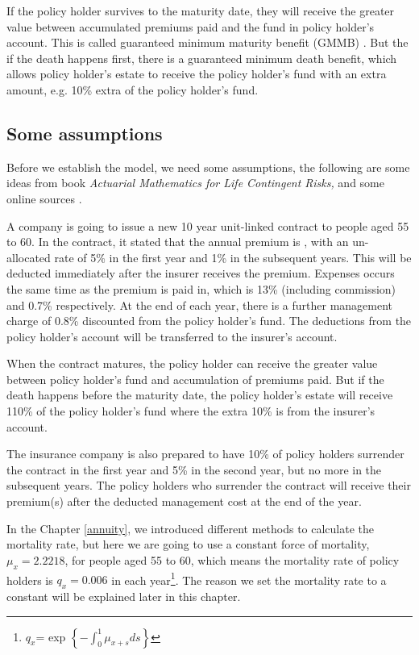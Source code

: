 \documentclass{report}
\begin{document}
If the policy holder survives to the maturity date, they will receive the greater value between accumulated premiums paid and the fund in policy holder's account. This is called guaranteed minimum maturity benefit (GMMB) \cite{bib:GMMB}. But the if the death happens first, there is a guaranteed minimum death benefit, which allows policy holder's estate to receive the policy holder's fund with an extra amount, e.g. 10\% extra of the policy holder's fund. 


\subsection{Some assumptions}  \label{unit-link-basic-assumptions}

Before we establish the model, we need some assumptions, the following are some ideas from  \cite{bib:unitlinkeg} book {\em Actuarial Mathematics for Life Contingent Risks,} and some online sources \cite{bib:unitlinkedonline}. 


A company is going to issue a new 10 year unit-linked contract to people aged 55 to 60. In the contract, it stated that the annual premium is , with an un-allocated rate of 5\% in the first year and 1\% in the subsequent years. This will be deducted immediately after the insurer receives the premium. Expenses occurs the same time as the premium is paid in, which is 13\% (including commission) and 0.7\% respectively. At the end of each year, there is a further management charge of 0.8\%  discounted from the policy holder's fund. The deductions from the policy holder's account will be transferred to the insurer's account.

When the contract matures, the policy holder can receive the greater value between policy holder's fund and accumulation of premiums paid. But if the death happens before the maturity date, the policy holder's estate will receive 110\% of the policy holder's fund where the extra 10\% is from the insurer's account.

The insurance company is also prepared to have 10\% of policy holders surrender the contract in the first year and 5\% in the second year, but no more in the subsequent years. The policy holders who surrender the contract will receive their premium(s) after the deducted management cost at the end of the year.

In the Chapter \ref{annuity}, we introduced different methods to calculate the mortality rate, but here we are going to use a constant force of mortality, $\mu_x=2.2218$, for people aged 55 to 60, which means the mortality rate of policy holders is $q_x=0.006$ in each year\footnote{$q_x$= exp $\left\{-\int_0^1 \mu_{x+s}ds\right\}$}. The reason we set the mortality rate to a constant will be explained later in this chapter.  
\end{document}
